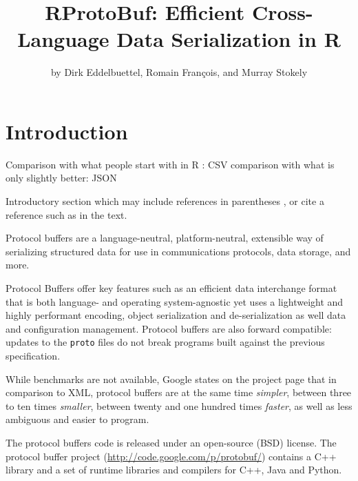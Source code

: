 \title{RProtoBuf: Efficient Cross-Language Data Serialization in R}
\author{by Dirk Eddelbuettel, Romain Fran\c{c}ois, and Murray Stokely}

\maketitle


\section{Introduction}

Comparison with what people start with in R : CSV
comparison with what is only slightly better: JSON

Introductory section which may include references in parentheses
\citep{R}, or cite a reference such as \citet{R} in the text.

Protocol buffers are a language-neutral, platform-neutral, extensible
way of serializing structured data for use in communications
protocols, data storage, and more.

Protocol Buffers offer key features such as an efficient data interchange
format that is both language- and operating system-agnostic yet uses a
lightweight and highly performant encoding, object serialization and
de-serialization as well data and configuration management. Protocol
buffers are also forward compatible: updates to the \texttt{proto}
files do not break programs built against the previous specification.

While benchmarks are not available, Google states on the project page that in
comparison to XML, protocol buffers are at the same time \textsl{simpler},
between three to ten times \textsl{smaller}, between twenty and one hundred
times \textsl{faster}, as well as less ambiguous and easier to program.

The protocol buffers code is released under an open-source (BSD) license. The
protocol buffer project (\url{http://code.google.com/p/protobuf/})
contains a C++ library and a set of runtime libraries and compilers for
C++, Java and Python.

